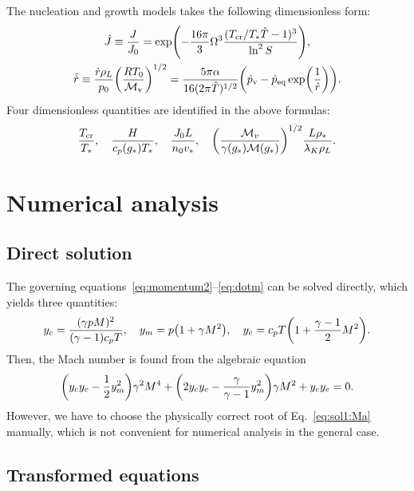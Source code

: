 \documentclass{article}
\newcommand{\vap}{\text{v}}
\newcommand{\eq}{\text{eq}}
\newcommand{\crit}[2][]{#2_\text{cr#1}}
\begin{document}
The nucleation and growth models takes the following dimensionless form:
\begin{gather}
    \hat{J} \equiv \frac{J}{J_0}
        = \exp(-\frac{16\pi}{3}\Omega^3\frac{(\crit{T}/T_*\hat{T}-1)^3}{\ln^2{S}}), \label{eq:nucleation3}\\
    \hat{\dot{r}} \equiv \frac{\dot{r}\rho_L}{p_0}\qty(\frac{RT_0}{\mathcal{M}_\vap})^{1/2}
        = \frac{5\pi\alpha}{16(2\pi\hat{T})^{1/2}}
            \qty(\hat{p}_\vap - \hat{p}_\eq\exp(\frac1{\hat{r}})). \label{eq:growth3}
\end{gather}
Four dimensionless quantities are identified in the above formulas:
\begin{equation}\label{eq:dimensionless}
    \frac{\crit{T}}{T_*}, \quad \frac{H}{c_p(g_*)T_*}, \quad
    \frac{J_0L}{n_0v_*}, \quad \qty(\frac{\mathcal{M}_v}{\gamma(g_*)\mathcal{M}(g_*)})^{1/2}\frac{L\rho_*}{\lambda_K\rho_L}.
\end{equation}

\section{Numerical analysis}

\subsection{Direct solution}

The governing equations~\eqref{eq:momentum2}--\eqref{eq:dotm} can be solved directly, which yields three quantities:
\begin{equation}\label{eq:sol1:y}
    y_c = \frac{(\gamma pM)^2}{(\gamma-1)c_pT}, \quad
    y_m = p\qty(1 + \gamma M^2), \quad
    y_e = c_pT\qty(1 + \frac{\gamma-1}{2}M^2).
\end{equation}
Then, the Mach number is found from the algebraic equation
\begin{equation}\label{eq:sol1:Ma}
    \qty(y_c y_e - \frac12y_m^2)\gamma^2M^4 + \qty(2y_c y_e - \frac{\gamma}{\gamma-1}y_m^2)\gamma M^2 + y_cy_e = 0.
\end{equation}
However, we have to choose the physically correct root of Eq.~\eqref{eq:sol1:Ma} manually,
which is not convenient for numerical analysis in the general case.

\subsection{Transformed equations}
\end{document}
